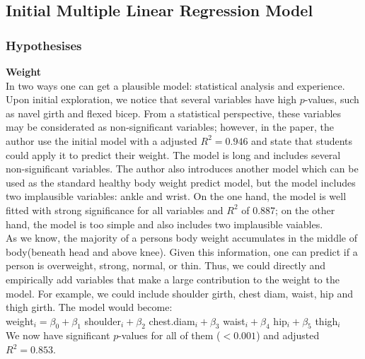 \documentclass[11pt]{article}\usepackage[]{graphicx}\usepackage[]{color}
\begin{document}

\subsection{Initial Multiple Linear Regression Model} 


\subsubsection{Hypothesises}%


\textbf{Weight}\\ 
In two ways one can get a plausible model: statistical analysis and experience. Upon initial exploration, we notice that several variables have high $p$-values, such as navel girth and flexed bicep. From a statistical perspective, these variables may be considerated as non-significant variables; however, in the paper, the author use the initial model with a adjusted $R^2 = 0.946$ and state that students could apply it to predict their weight. The model is long and includes several non-significant variables. The author also introduces another model which can be used as the standard healthy body weight predict model, but the model includes two implausible variables: ankle and wrist. On the one hand, the model is well fitted with strong significance for all variables and $R^2$ of 0.887; on the other hand, the model is too simple and also includes two implausible vaiables.\\

As we know, the majority of a persons body weight accumulates in the middle of body(beneath head and above knee). Given this information, one can predict if a person is overweight, strong, normal, or thin. Thus, we could directly and empirically add variables that make a large contribution to the weight to the model. For example, we could include shoulder girth, chest diam, waist, hip and thigh girth. The model would become:\\

weight$_i = \beta_0 + \beta_1$ shoulder$_i + \beta_2$ chest.diam$_i + \beta_3$ waist$_i + \beta_4$ hip$_i + \beta_5$ thigh$_i$ \\

We now have significant $p$-values for all of them ($<0.001$) and adjusted $R^2 = 0.853$. \\
\end{document}
